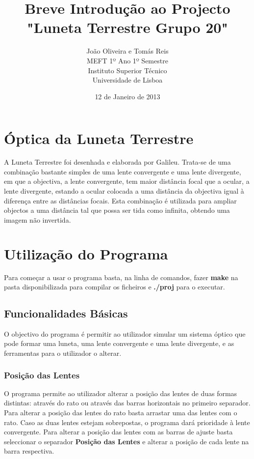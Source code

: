 \documentclass[a4paper,12pt]{article}
\begin{document}
\title{\bf Breve Introdução ao Projecto "Luneta Terrestre Grupo 20"}
\author{João Oliveira e Tomás Reis \\ 
MEFT 1º Ano 1º Semestre \\ 
Instituto Superior Técnico  \\
Universidade de Lisboa\\}
\date{12 de Janeiro de 2013}
\maketitle

\section{Óptica da Luneta Terrestre}
A Luneta Terrestre foi desenhada e elaborada por Galileu. Trata-se de uma combinação bastante simples de uma lente convergente e uma lente divergente, em que a objectiva, a lente convergente, tem maior distância focal que a ocular, a lente divergente, estando a ocular colocada a uma distância da objectiva igual à diferença entre as distâncias focais.
Esta combinação é utilizada para ampliar objectos a uma distância tal que possa ser tida como infinita, obtendo uma imagem não invertida. 
\par
 
\section{Utilização do Programa}

Para começar a usar o programa basta, na linha de comandos, fazer {\bf make} na pasta disponibilizada para compilar os ficheiros e {\bf ./proj} para o executar.

\subsection{Funcionalidades Básicas}
O objectivo do programa é permitir ao utilizador simular um sistema óptico que pode formar uma luneta, uma lente convergente e uma lente divergente, e as ferramentas para o utilizador o alterar.

\subsubsection{Posição das Lentes}
O programa permite ao utilizador alterar a posição das lentes de duas formas distintas: através do rato ou através das barras horizontais no primeiro separador. Para alterar a posição das lentes do rato basta arrastar uma das lentes com o rato. Caso as duas lentes estejam sobrepostas, o programa dará prioridade à lente convergente. Para alterar a posição das lentes com as barras de ajuste basta seleccionar o separador {\bf Posição das Lentes} e alterar a posição de cada lente na barra respectiva.
\end{document}
